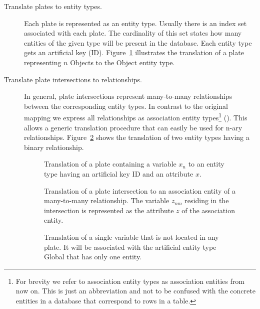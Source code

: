 \begin{description}
\item[Translate plates to entity types.] Each plate is represented as an entity type. Usually there is an index set associated with each plate. The cardinality of this set states how many entities of the given type will be present in the database. Each entity type gets an artificial key (ID). Figure~\ref{fig:pm2erm_uno_local} illustrates the translation of a plate representing $n$ Objects to the Object entity type.

\item[Translate plate intersections to relationships.] In general, plate intersections represent many-to-many relationships between the corresponding entity types. In contrast to the original mapping we express all relationships as association entity types\footnote{For brevity we refer to association entity types as association entities from now on. This is just an abbreviation and not to be confused with the concrete entities in a database that correspond to rows in a table.} (\cite[p.~86-88]{elmasri2007database}). This allows a generic translation procedure that can easily be used for n-ary relationships. Figure~\ref{fig:pm2erm_bi_noconstraints} shows the translation of two entity types having a binary relationship.

\begin{figure}[h!]
\centering
\scalebox{\tikzScale}{\adjustTikzSize }
\caption[Translation of a plate containing a single variable to an ERM]{Translation of a plate containing a variable $x_n$ to an entity type having an artificial key ID and an attribute $x$.}\label{fig:pm2erm_uno_local}
\end{figure}

\begin{figure}[h!]
\centering
\scalebox{\tikzScale}{\adjustTikzSize }
\caption[Translation of a plate intersection to an ERM]{Translation of a plate intersection to an association entity of a many-to-many relationship. The variable $z_{nm}$ residing in the intersection is represented as the attribute $z$ of the association entity.}\label{fig:pm2erm_bi_noconstraints}
\end{figure}

\begin{figure}[h!]
\centering
\scalebox{\tikzScale}{\adjustTikzSize }
\caption[Translation of a variable associated with no plate to an ERM]{Translation of a single variable that is not located in any plate. It will be associated with the artificial entity type Global that has only one entity.}\label{fig:pm2erm_uno_global}
\end{figure}


\end{description}

